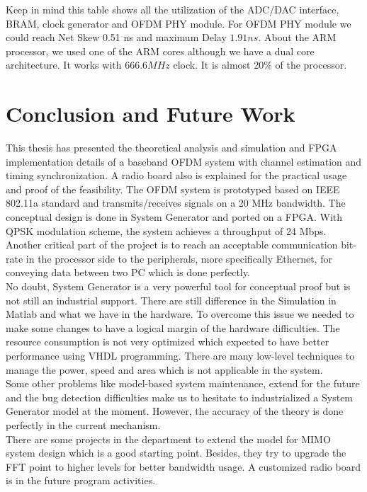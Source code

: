 Keep in mind this table shows all the utilization of the ADC/DAC interface, BRAM, clock generator and OFDM PHY module. For OFDM PHY module we could reach Net Skew 0.51 ns and maximum  Delay $1.91 ns$. About the ARM processor, we used one of the ARM cores although we have a dual core architecture. It works with $666.6 MHz$ clock. It is almost 20\% of the processor.\\

\section{Conclusion and Future Work}

This thesis has presented the theoretical analysis and simulation and  FPGA implementation details of a baseband OFDM system with channel estimation and timing synchronization. A radio board also is explained for the practical usage and proof of the feasibility. The OFDM system is prototyped based on IEEE 802.11a standard and transmits/receives signals on a 20 MHz bandwidth. The conceptual design is done in System Generator and ported on a FPGA. With QPSK modulation scheme, the system achieves a throughput of 24 Mbps.\\
Another critical part of the project is to reach an acceptable communication bit-rate in the processor side to the peripherals, more specifically Ethernet, for conveying data between two PC which is done perfectly.\\
No doubt, System Generator is a very powerful tool for conceptual proof but is not still an industrial support. There are still difference in the Simulation in Matlab and what we have in the hardware. To overcome this issue we needed to make some changes to have a logical margin of the hardware difficulties. The resource consumption is not very optimized which expected to have better performance using VHDL programming. There are many low-level techniques to manage the power, speed and area which is not applicable in the system.\\
Some other problems like model-based system maintenance, extend for the future and the bug detection difficulties make us to hesitate to industrialized a System Generator model at the moment. However, the accuracy of the theory is done perfectly in the current mechanism.\\
There are some projects in the department to extend the model for MIMO system design which is a good starting point. Besides, they try to upgrade the FFT point to higher levels for better bandwidth usage. A customized radio board is in the future program activities.\\